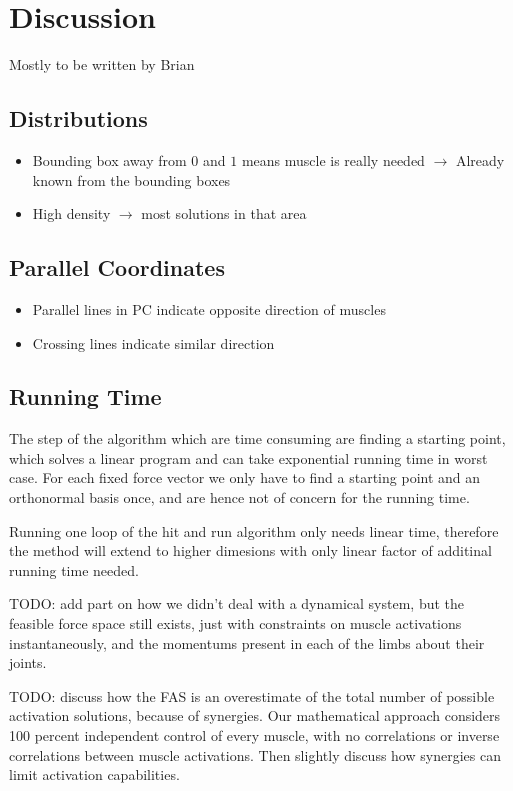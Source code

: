 \section{Discussion}
Mostly to be written by Brian
\subsection{Distributions}

\begin{itemize}
	\item Bounding box away from $0$ and $1$ means muscle is really needed $\rightarrow$ Already known from the bounding boxes
	\item High density $\rightarrow$ most solutions in that area
\end{itemize}

\subsection{Parallel Coordinates}
\begin{itemize}
	\item Parallel lines in PC indicate opposite direction of muscles
	\item Crossing lines indicate similar direction

\end{itemize}

\subsection{Running Time}
The step of the algorithm which are time consuming are finding a starting point, which solves a linear program and can take exponential running time in worst case. For each fixed force vector we only have to find a starting point and an orthonormal basis once, and are hence not of concern for the running time.

Running one loop of the hit and run algorithm only needs linear time, therefore the method will extend to higher dimesions with only linear factor of additinal running time needed.

TODO: add part on how we didn't deal with a dynamical system, but the feasible force space still exists, just with constraints on muscle activations instantaneously, and the momentums present in each of the limbs about their joints.

TODO: discuss how the FAS is an overestimate of the total number of possible activation solutions, because of synergies. Our mathematical approach considers 100 percent independent control of every muscle, with no correlations or inverse correlations between muscle activations. Then slightly discuss how synergies can limit activation capabilities.